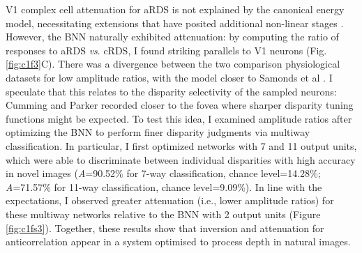 {V1 complex cell attenuation for aRDS is not explained by the canonical energy model, necessitating extensions that have posited additional non-linear stages \cite{Lippert:2001ur, Haefner:2008jg, Samonds:2013cs, Read:2002kx}. However, the BNN naturally exhibited attenuation: by computing the ratio of responses to aRDS {\it vs}. cRDS, I found striking parallels to V1 neurons \cite{Cumming:1997ve, Samonds:2013cs} (Fig. \ref{fig:c1f3}C). There was a divergence between the two comparison physiological datasets for low amplitude ratios, with the model closer to Samonds et al \cite{Samonds:2013cs}. I speculate that this relates to the disparity selectivity of the sampled neurons: Cumming and Parker \cite{Cumming:1997ve} recorded closer to the fovea where sharper disparity tuning functions might be expected. To test this idea, I examined amplitude ratios after optimizing the BNN to perform finer disparity judgments via multiway classification. In particular, I first optimized networks with 7 and 11 output units, which were able to discriminate between individual disparities with high accuracy in novel images ({\it A}=90.52\% for 7-way classification, chance level=14.28\%; {\it A}=71.57\% for 11-way classification, chance level=9.09\%). In line with the expectations, I observed greater attenuation (i.e., lower amplitude ratios) for these multiway networks relative to the BNN with 2 output units (Figure \ref{fig:c1fs3}). Together, these results show that inversion and attenuation for anticorrelation appear in a system optimised to process depth in natural images.

}
